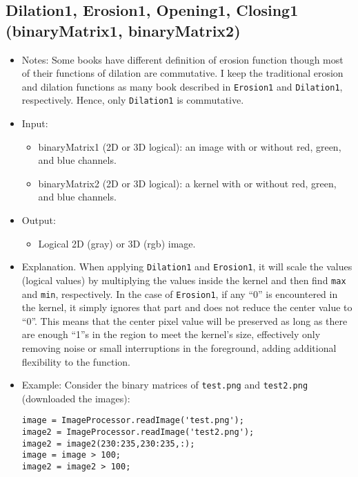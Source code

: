 \documentclass[11pt]{amsart}
\theoremstyle{remark}
\providecommand{\tightlist}{%
  \setlength{\itemsep}{0pt}\setlength{\parskip}{0pt}}
\theoremstyle{definition}
\theoremstyle{remark}
\numberwithin{equation}{section}
\begin{document}
\subsection{Dilation1, Erosion1, Opening1, Closing1 (binaryMatrix1,
binaryMatrix2)}\label{dilation1-erosion1-opening1-closing1-binarymatrix1-binarymatrix2}

\begin{itemize}
\item
  Notes: Some books have different definition of erosion function though
  most of their functions of dilation are commutative. I keep the
  traditional erosion and dilation functions as many book described in
  \texttt{Erosion1} and \texttt{Dilation1}, respectively. Hence, only
  \texttt{Dilation1} is commutative.
\item
  Input:

  \begin{itemize}
  \tightlist
  \item
    binaryMatrix1 (2D or 3D logical): an image with or without red,
    green, and blue channels.
  \item
    binaryMatrix2 (2D or 3D logical): a kernel with or without red,
    green, and blue channels.
  \end{itemize}
\item
  Output:

  \begin{itemize}
  \tightlist
  \item
    Logical 2D (gray) or 3D (rgb) image.
  \end{itemize}
\item
  Explanation. When applying \texttt{Dilation1} and \texttt{Erosion1},
  it will scale the values (logical values) by multiplying the values
  inside the kernel and then find \texttt{max} and \texttt{min},
  respectively. In the case of \texttt{Erosion1}, if any ``0'' is
  encountered in the kernel, it simply ignores that part and does not
  reduce the center value to ``0''. This means that the center pixel
  value will be preserved as long as there are enough ``1''s in the
  region to meet the kernel's size, effectively only removing noise or
  small interruptions in the foreground, adding additional flexibility
  to the function.
\item
  Example: Consider the binary matrices of \texttt{test.png} and
  \texttt{test2.png} (downloaded the images):

\begin{verbatim}
image = ImageProcessor.readImage('test.png');
image2 = ImageProcessor.readImage('test2.png');
image2 = image2(230:235,230:235,:);
image = image > 100;
image2 = image2 > 100;
\end{verbatim}


\end{itemize}
\end{document}
